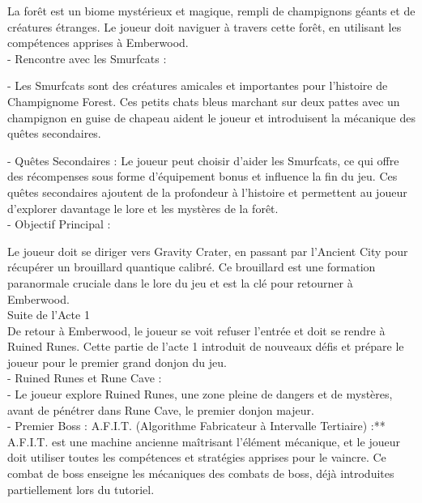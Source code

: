 La forêt est un biome mystérieux et magique, rempli de champignons géants et de créatures étranges.
Le joueur doit naviguer à travers cette forêt, en utilisant les compétences apprises à Emberwood.
\\


- Rencontre avec les Smurfcats :

- Les Smurfcats sont des créatures amicales et importantes pour l'histoire de Champignome Forest.
Ces petits chats bleus marchant sur deux pattes avec un champignon en guise de chapeau aident le joueur et introduisent la mécanique des quêtes secondaires.

- Quêtes Secondaires : Le joueur peut choisir d'aider les Smurfcats, ce qui offre des récompenses sous forme d'équipement bonus et influence la fin du jeu.
Ces quêtes secondaires ajoutent de la profondeur à l'histoire et permettent au joueur d'explorer davantage le lore et les mystères de la forêt.
\\



- Objectif Principal :

Le joueur doit se diriger vers Gravity Crater, en passant par l'Ancient City pour récupérer un brouillard quantique calibré. Ce brouillard est une formation paranormale cruciale dans le lore du jeu et est la clé pour retourner à Emberwood.
\\

Suite de l'Acte 1
\\

De retour à Emberwood, le joueur se voit refuser l'entrée et doit se rendre à Ruined Runes. Cette partie de l'acte 1 introduit de nouveaux défis et prépare le joueur pour le premier grand donjon du jeu.
\\

- Ruined Runes et Rune Cave :
\\

- Le joueur explore Ruined Runes, une zone pleine de dangers et de mystères, avant de pénétrer dans Rune Cave, le premier donjon majeur.
\\

- Premier Boss : A.F.I.T. (Algorithme Fabricateur à Intervalle Tertiaire) :** A.F.I.T. est une machine ancienne maîtrisant l'élément mécanique, et le joueur doit utiliser toutes les compétences et stratégies apprises pour le vaincre. Ce combat de boss enseigne les mécaniques des combats de boss, déjà introduites partiellement lors du tutoriel.
\\

